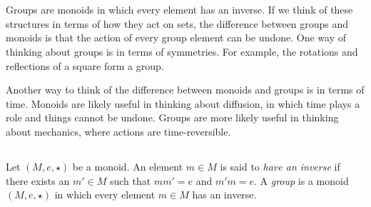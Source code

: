 

\section{}\label{sec:groups}

\begin{blockENG}
Groups are monoids in which every element has an inverse. If we think of these structures in terms of how they act on sets, the difference between groups and monoids is that the action of every group element can be undone. One way of thinking about groups is in terms of symmetries. For example, the rotations and reflections of a square form a group. 
\end{blockENG}

\begin{blockRUS}
\end{blockRUS}

\begin{blockENG}
Another way to think of the difference between monoids and groups is in terms of time. Monoids are likely useful in thinking about diffusion, in which time plays a role and things cannot be undone. Groups are more likely useful in thinking about mechanics, where actions are time-reversible. 
\end{blockENG}

\begin{blockRUS}
\end{blockRUS}


\subsection{}

\begin{definitionENG}\label{def:group}
Let $(M,e,\star)$ be a monoid. An element $m\in M$ is said to {\em have an inverse} if there exists an $m'\in M$ such that $mm'=e$ and $m'm=e$. A {\em group} is a monoid $(M,e,\star)$ in which every element $m\in M$ has an inverse.
\end{definitionENG}

\begin{definitionRUS}\label{def:group}
\end{definitionRUS}

